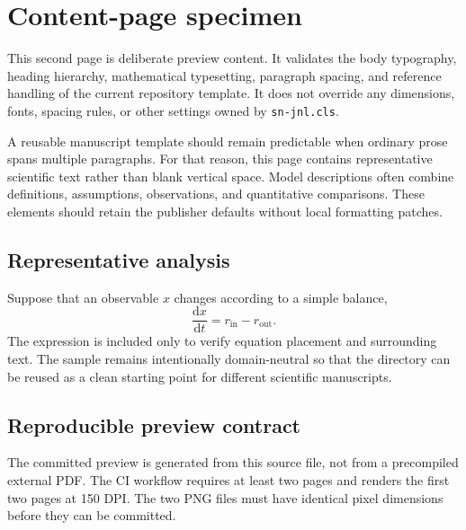 \documentclass[pdflatex,sn-nature]{sn-jnl}
\begin{document}
\clearpage
\section{Content-page specimen}
This second page is deliberate preview content. It validates the body typography, heading hierarchy, mathematical typesetting, paragraph spacing, and reference handling of the current repository template. It does not override any dimensions, fonts, spacing rules, or other settings owned by \texttt{sn-jnl.cls}.

A reusable manuscript template should remain predictable when ordinary prose spans multiple paragraphs. For that reason, this page contains representative scientific text rather than blank vertical space. Model descriptions often combine definitions, assumptions, observations, and quantitative comparisons. These elements should retain the publisher defaults without local formatting patches.

\subsection{Representative analysis}
Suppose that an observable $x$ changes according to a simple balance,
\begin{equation}
  \frac{\mathrm{d}x}{\mathrm{d}t}=r_{\mathrm{in}}-r_{\mathrm{out}}.
\end{equation}
The expression is included only to verify equation placement and surrounding text. The sample remains intentionally domain-neutral so that the directory can be reused as a clean starting point for different scientific manuscripts.

\subsection{Reproducible preview contract}
The committed preview is generated from this source file, not from a precompiled external PDF. The CI workflow requires at least two pages and renders the first two pages at 150 DPI. The two PNG files must have identical pixel dimensions before they can be committed.


\end{document}
